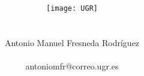 \documentclass[10pt,spanish]{article}
\author{
	\\\\
	\texttt{[image: UGR]} \\\\\\
	\Large 	Antonio Manuel Fresneda Rodríguez\\
	\\antoniomfr@correo.ugr.es
	}
\date{}
\title{\huge \textbf{}}
\begin{document}
	\maketitle
	\pagebreak
	\pagebreak
\end{document}
